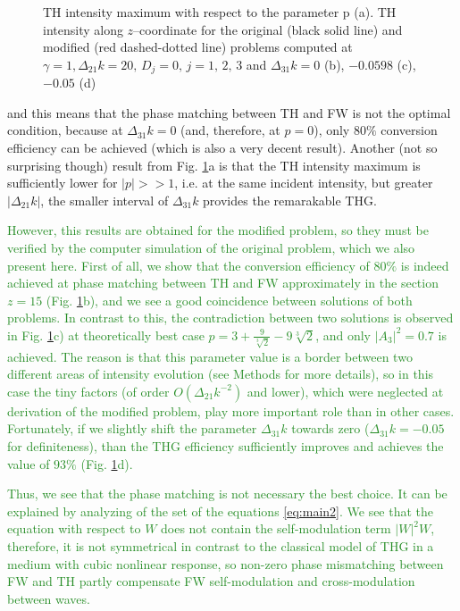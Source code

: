 \documentclass[a4paper, 12pt, onecolumn]{extarticle}
\begin{document}
{\begin{figure}
    \caption{TH intensity maximum with respect to the parameter p (a). TH intensity along $z$--coordinate for the original (black solid line) and modified (red dashed-dotted line) problems computed at $\gamma=1,\Delta_{21}k=20,\,D_j=0,\,j=1,\,2,\,3$ and $\Delta_{31}k=0$ (b), $-0.0598$ (c), $-0.05$ (d)}
    \label{fr:cglp}
\end{figure}
and this means that the phase matching between TH and FW is not the optimal condition, because at $\Delta_{31}k=0$ (and, therefore, at $p=0$), only $80\%$ conversion efficiency can be achieved (which is also a very decent result). Another (not so surprising though) result from Fig. \ref{fr:cglp}a is that the TH intensity maximum is sufficiently lower for $|p|>>1$, i.e. at the same incident intensity, but greater $|\Delta_{21}k|$, the smaller interval of $\Delta_{31}k$ provides the remarakable THG. 
}  

\textcolor{ForestGreen}
{
However, this results are obtained for the modified problem, so they must be verified by the computer simulation of the original problem, which we also present here. First of all, we show that the conversion efficiency of $80\%$ is indeed achieved at phase matching between TH and FW approximately in the section $z=15$ (Fig. \ref{fr:cglp}b), and we see a good coincidence between solutions of both problems. In contrast to this, the contradiction between two solutions is observed in Fig. \ref{fr:cglp}c) at theoretically best case $p=3+ \frac{9}{\sqrt[3]{2}}-9\sqrt[3]{2}$, and only $|A_3|^2=0.7$ is achieved. The reason is that this parameter value is a border between two different areas of intensity evolution (see Methods for more details), so in this case the tiny factors (of order $O(\Delta_{21}k^{-2})$ and lower), which were neglected at derivation of the modified problem, play more important role than in other cases. Fortunately, if we slightly shift the parameter $\Delta_{31}k$ towards zero ($\Delta_{31}k=-0.05$ for definiteness), than the THG efficiency sufficiently improves and achieves the value of $93\%$ (Fig. \ref{fr:cglp}d).
}

\textcolor{ForestGreen}
{
Thus, we see that the phase matching is not necessary the best choice. It can be explained by analyzing of the set of the equations \eqref{eq:main2}. We see that the equation with respect to $W$ does not contain the self-modulation term $|W|^2W$, therefore, it is not symmetrical in contrast to the classical model of THG in a medium with cubic nonlinear response, so non-zero phase mismatching between FW and TH partly compensate FW self-modulation and cross-modulation between waves.
}
\end{document}

